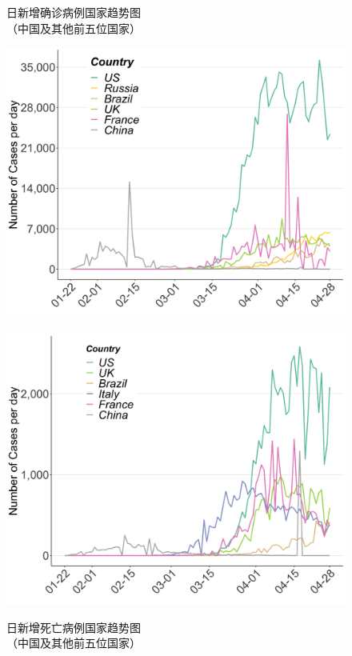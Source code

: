 \documentclass[]{article}
\begin{document}
\begin{figure}[H]
\centering
\begin{minipage}[b]{0.45\linewidth}
\caption{日新增确诊病例国家趋势图\\（中国及其他前五位国家）}
\includegraphics[]{./input/covid2.png}
\label{}
\end{minipage}
\quad
\begin{minipage}[b]{0.45\linewidth}
\caption{日新增死亡病例国家趋势图\\（中国及其他前五位国家） }
\includegraphics[]{./input/covid3.png}
\label{}
\end{minipage}
\end{figure}
\end{document}
